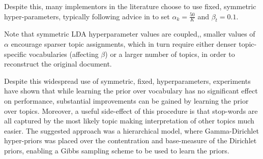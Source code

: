 Despite this, many implementors in the literature choose to use fixed, symmetric hyper-parameters, typically following advice in \cite{Griffiths2004} to set $\alpha_k = \frac{50}{K}$ and $\beta_t=0.1$. 

Note that symmetric LDA hyperparameter values are coupled,, smaller values of $\alpha$ encourage sparser topic assignments, which in turn require either denser topic-specific vocabularies (affecting $\beta$) or a larger number of topics, in order to reconstruct the original document.


%

Despite this widespread use of symmetric, fixed, hyperparameters, experiments have shown\cite{Wallach2009a} that while learning the prior over vocabulary has no significant effect on performance, substantial improvements can be gained by learning the prior over topics. Moreover, a useful side-effect of this procedure is that stop-words are all captured by the most likely topic making interpretation of other topics much easier. The suggested approach was a hierarchical model, where Gamma-Dirichlet hyper-priors was placed over the contentration and base-measure of the Dirichlet priors, enabling a Gibbs sampling scheme to be used to learn the priors.











